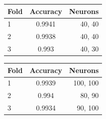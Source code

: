 \documentclass[12pt]{report}
\begin{document}
\par\null\par

\begin{center}
\begin{tabular}{lcr}
\toprule
Fold & Accuracy & Neurons \\
\midrule
1  & 0.9941 & 40, 40\\
2  & 0.9938 & 40, 40\\
3  & 0.993 & 40, 30\\
\bottomrule
\end{tabular}
\end{center}

\par\null\par

\begin{center}
\begin{tabular}{lcr}
\toprule
Fold & Accuracy & Neurons \\
\midrule
1  & 0.9939 & 100, 100\\
2  & 0.994 & 80, 90\\
3  & 0.9934 & 90, 100\\
\bottomrule
\end{tabular}
\end{center}

{}

\end{document}
